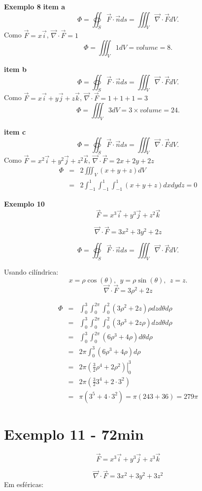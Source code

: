 \documentclass[a4paper,10pt]{book}
\begin{document}
{\bf Exemplo 8}
{\bf item a}
$$\Phi=\oiint_S\vec{F}\cdot \vec{n}ds = \iiint_V \vec{\nabla}\cdot \vec{F}dV.$$
Como $\vec{F}=x\vec{i}$, $\vec{\nabla}\cdot \vec{F}=1$
$$\Phi= \iiint_V 1dV=volume = 8.$$


{\bf item b}
$$\Phi=\oiint_S\vec{F}\cdot \vec{n}ds = \iiint_V \vec{\nabla}\cdot \vec{F}dV.$$
Como $\vec{F}=x\vec{i}+y\vec{j}+z\vec{k}$, $\vec{\nabla}\cdot \vec{F}=1+1+1=3$
$$\Phi= \iiint_V 3dV=3\times volume = 24.$$


{\bf item c}
$$\Phi=\oiint_S\vec{F}\cdot \vec{n}ds = \iiint_V \vec{\nabla}\cdot \vec{F}dV.$$
Como $\vec{F}=x^2\vec{i}+y^2\vec{j}+z^2\vec{k}$, $\vec{\nabla}\cdot \vec{F}=2x+2y+2z$
\begin{eqnarray*}
\Phi&=& 2\iiint_V(x+y+z) dV \\
&=&2\int_{-1}^1\int_{-1}^1\int_{-1}^1(x+y+z)dxdydz=0
\end{eqnarray*}


{\bf Exemplo 10}
$$\vec{F}=x^3\vec{i}+y^3\vec{j}+z^2\vec{k}$$

$$\vec{\nabla}\cdot\vec{F}=3x^2+3y^2+2z$$

$$\Phi=\oiint_S\vec{F}\cdot \vec{n}ds = \iiint_V \vec{\nabla}\cdot \vec{F}dV.$$

Usando cilíndrica:
$$x=\rho \cos(\theta),~~y=\rho \sin(\theta),~~z=z.$$
$$\vec{\nabla}\cdot\vec{F}=3\rho^2+2z$$

\begin{eqnarray*}\Phi&=&\int_0^3 \int_0^{2\pi} \int_0^2 (3\rho^2+2z)\rho dz d\theta d\rho\\
&=&\int_0^3 \int_0^{2\pi} \int_0^2 (3\rho^3+2z\rho) dz d\theta d\rho\\
&=&\int_0^3 \int_0^{2\pi}  (6\rho^3+4\rho) d\theta d\rho\\
&=&2\pi \int_0^3   (6\rho^3+4\rho)  d\rho\\
&=&2\pi \left.\left(\frac{3}{2}\rho^4+2\rho^2\right)\right|_0^3\\
&=&2\pi \left(\frac{3}{2}3^4+2\cdot3^2\right)\\
&=&\pi \left(3^5+4\cdot3^2\right)=\pi(243+36)=279\pi
\end{eqnarray*}

\section{Exemplo 11 - 72min}

$$\vec{F}=x^3\vec{i}+y^3\vec{j}+z^3\vec{k}$$

$$\vec{\nabla}\cdot \vec{F}=3x^2+3y^2+3z^2$$
 Em esféricas:
 
\end{document}
